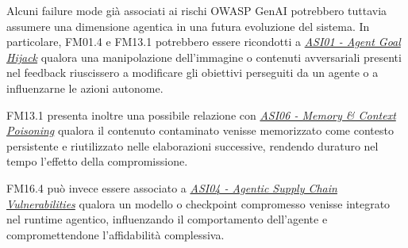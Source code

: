 
Alcuni failure mode già associati ai rischi OWASP GenAI potrebbero tuttavia assumere una dimensione agentica in una futura evoluzione del sistema. In particolare, FM01.4 e FM13.1 potrebbero essere ricondotti a
\href{https://genai.owasp.org/2025/12/09/owasp-top-10-for-agentic-applications-the-benchmark-for-agentic-security-in-the-age-of-autonomous-ai/}
{\textit{ASI01 - Agent Goal Hijack}} qualora una manipolazione dell'immagine o contenuti avversariali presenti nel feedback riuscissero a modificare gli obiettivi perseguiti da un agente o a influenzarne le azioni autonome.


FM13.1 presenta inoltre una possibile relazione con \href{https://genai.owasp.org/2026/05/13/memory-is-a-feature-it-is-also-an-attack-surface/} {\textit{ASI06 - Memory \& Context Poisoning}}
qualora il contenuto contaminato venisse memorizzato come contesto persistente e riutilizzato nelle elaborazioni successive, rendendo duraturo nel tempo l'effetto della compromissione.


FM16.4 può invece essere associato a \href{https://genai.owasp.org/2025/12/09/owasp-top-10-for-agentic-applications-the-benchmark-for-agentic-security-in-the-age-of-autonomous-ai/} {\textit{ASI04 - Agentic Supply Chain Vulnerabilities}} qualora un modello o checkpoint compromesso venisse integrato nel runtime agentico, influenzando il comportamento dell'agente e compromettendone l'affidabilità complessiva.

